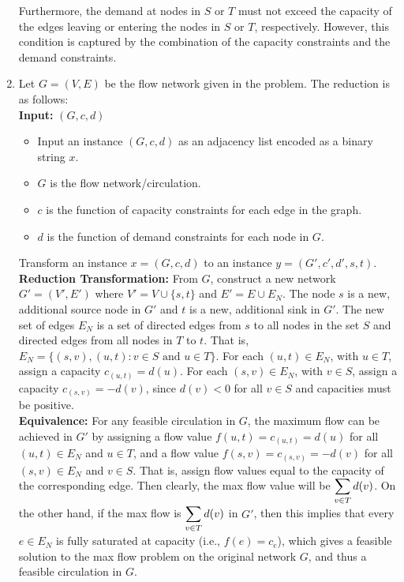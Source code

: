 \documentclass[twoside,11pt]{homework}
\begin{document}
\begin{enumerate}[\bf (i.)]
Furthermore,  the demand at nodes in $S$ or $T$ must not exceed the capacity of the edges leaving or entering the nodes in $S$ or $T$, respectively.   However, this condition is captured by the combination of the capacity constraints and the demand constraints. 

\item Let $G = (V, E)$ be the flow network given in the problem.  The reduction is as follows: \\[0.2em]
\textbf{Input:} $(G, c, d)$
\begin{itemize}
\item Input an instance $(G, c, d)$ as an adjacency list encoded as a binary string $x$.
\item $G$ is the flow network/circulation.
\item $c$ is the function of capacity constraints for each edge in the graph.
\item $d$ is the function of demand constraints for each node in $G$.
\end{itemize} 
Transform an instance $x = (G, c, d)$ to an instance $y=(G', c', d', s, t)$. \\[0.4em]
\textbf{Reduction Transformation:} From $G$, construct a new network  $G' = (V', E')$ where $V' = V \cup \{s, t\}$ and $E' = E \cup E_{N}$.  The node $s$ is a new, additional source node in $G'$ and $t$ is a new,  additional sink in $G'$.  The new set of edges $E_{N}$ is a set of directed edges from $s$ to all nodes in the set $S$ and directed edges from all nodes in $T$ to $t$.  That is,  $E_{N} = \{(s, v),  (u, t) : v \in S \textrm{ and } u \in T\}$.  For each $(u, t) \in E_{N}$, with  $u \in T$,  assign a capacity $c_{(u, t)} = d(u)$.  For each $(s, v) \in E_{N}$,  with $v \in S$,  assign a capacity $c_{(s, v)} = -d(v)$,  since $d(v) < 0$ for all $v \in S$ and capacities must be positive.  \\

\textbf{Equivalence:} For any feasible circulation in $G$, the maximum flow can be achieved in $G'$ by assigning a flow value $f(u, t) = c_{(u, t)} = d(u)$ for all $ (u, t) \in E_{N} $ and $u \in T$, and a flow value $f(s, v) = c_{(s, v)} = -d(v)$ for all $(s, v) \in E_{N}$ and $v \in S$.  That is, assign flow values equal to the capacity of the corresponding edge.  Then clearly, the max flow value will be $\mathlarger{\sum_{v \in T} d(v)}$.  On the other hand, if the max flow is $\mathlarger{\sum_{v \in T} d(v)}$ in $G'$,  then this implies that every $e \in E_{N}$ is fully saturated at capacity (i.e., $f(e) = c_e$), which gives a feasible  solution to the max flow problem on the original network $G$, and thus a feasible circulation in $G$. \\


\end{enumerate}
\end{document}
